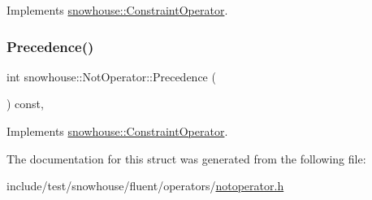 Implements \mbox{\hyperlink{structsnowhouse_1_1ConstraintOperator_a885882868139127eb8ff3f3ec6a97737}{snowhouse\+::\+Constraint\+Operator}}.

\mbox{\label{structsnowhouse_1_1NotOperator_aa8efde1ec3fd4ff2fee91a6985b6c36c}} 
\subsubsection{\texorpdfstring{Precedence()}{Precedence()}}
{\footnotesize\ttfamily int snowhouse\+::\+Not\+Operator\+::\+Precedence (\begin{DoxyParamCaption}{ }\end{DoxyParamCaption}) const\hspace{0.3cm}{\ttfamily [inline]}, {\ttfamily [virtual]}}



Implements \mbox{\hyperlink{structsnowhouse_1_1ConstraintOperator_ac7c231c1a9f183c0a2cce8544566eeff}{snowhouse\+::\+Constraint\+Operator}}.



The documentation for this struct was generated from the following file\+:\begin{DoxyCompactItemize}
\item 
include/test/snowhouse/fluent/operators/\mbox{\hyperlink{notoperator_8h}{notoperator.\+h}}\end{DoxyCompactItemize}
